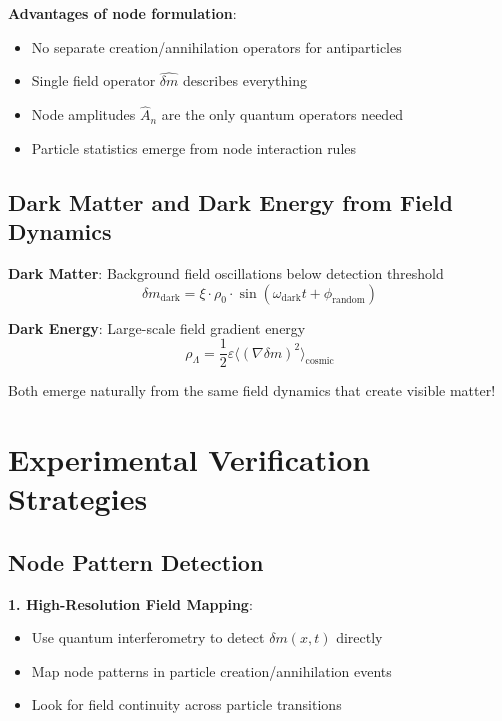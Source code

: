 \documentclass[12pt,a4paper]{article}
\newcommand{\deltam}{\delta m}
\newcommand{\xipar}{\xi}
\theoremstyle{definition}
\theoremstyle{remark}
\begin{document}
	\textbf{Advantages of node formulation}:
	\begin{itemize}
		\item No separate creation/annihilation operators for antiparticles
		\item Single field operator $\hat{\deltam}$ describes everything
		\item Node amplitudes $\hat{A}_n$ are the only quantum operators needed
		\item Particle statistics emerge from node interaction rules
	\end{itemize}
	
	\subsection{Dark Matter and Dark Energy from Field Dynamics}
	
	\textbf{Dark Matter}: Background field oscillations below detection threshold
	\begin{equation}
		\deltam_{\text{dark}} = \xipar \cdot \rho_0 \cdot \sin(\omega_{\text{dark}} t + \phi_{\text{random}})
	\end{equation}
	
	\textbf{Dark Energy}: Large-scale field gradient energy
	\begin{equation}
		\rho_{\Lambda} = \frac{1}{2} \varepsilon \langle (\nabla \deltam)^2 \rangle_{\text{cosmic}}
	\end{equation}
	
	Both emerge naturally from the same field dynamics that create visible matter!
	
	\section{Experimental Verification Strategies}
	
	\subsection{Node Pattern Detection}
	
	\textbf{1. High-Resolution Field Mapping}:
	\begin{itemize}
		\item Use quantum interferometry to detect $\deltam(x,t)$ directly
		\item Map node patterns in particle creation/annihilation events
		\item Look for field continuity across particle transitions
	\end{itemize}
	
\end{document}
